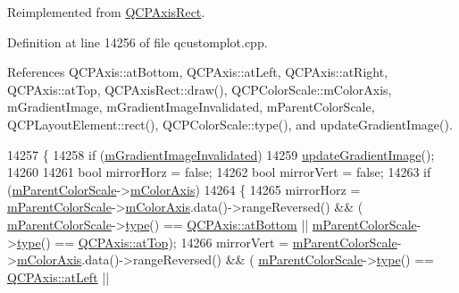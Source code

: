 Reimplemented from \hyperlink{class_q_c_p_axis_rect_afb1bbbbda8345cd2710d92ee48440b53}{Q\+C\+P\+Axis\+Rect}.



Definition at line 14256 of file qcustomplot.\+cpp.



References Q\+C\+P\+Axis\+::at\+Bottom, Q\+C\+P\+Axis\+::at\+Left, Q\+C\+P\+Axis\+::at\+Right, Q\+C\+P\+Axis\+::at\+Top, Q\+C\+P\+Axis\+Rect\+::draw(), Q\+C\+P\+Color\+Scale\+::m\+Color\+Axis, m\+Gradient\+Image, m\+Gradient\+Image\+Invalidated, m\+Parent\+Color\+Scale, Q\+C\+P\+Layout\+Element\+::rect(), Q\+C\+P\+Color\+Scale\+::type(), and update\+Gradient\+Image().


\begin{DoxyCode}
14257 \{
14258   \textcolor{keywordflow}{if} (\hyperlink{class_q_c_p_color_scale_axis_rect_private_a2c0b15b071e1f93006b48b5be022a631}{mGradientImageInvalidated})
14259     \hyperlink{class_q_c_p_color_scale_axis_rect_private_a73754cab312aeaddea1bfcc67cc079ac}{updateGradientImage}();
14260   
14261   \textcolor{keywordtype}{bool} mirrorHorz = \textcolor{keyword}{false};
14262   \textcolor{keywordtype}{bool} mirrorVert = \textcolor{keyword}{false};
14263   \textcolor{keywordflow}{if} (\hyperlink{class_q_c_p_color_scale_axis_rect_private_a311c73f51a4cb0b556388197833cf099}{mParentColorScale}->\hyperlink{class_q_c_p_color_scale_a2efbc90fd31898fe05d2b74a8422b1d5}{mColorAxis})
14264   \{
14265     mirrorHorz = \hyperlink{class_q_c_p_color_scale_axis_rect_private_a311c73f51a4cb0b556388197833cf099}{mParentColorScale}->\hyperlink{class_q_c_p_color_scale_a2efbc90fd31898fe05d2b74a8422b1d5}{mColorAxis}.data()->rangeReversed() && (
      \hyperlink{class_q_c_p_color_scale_axis_rect_private_a311c73f51a4cb0b556388197833cf099}{mParentColorScale}->\hyperlink{class_q_c_p_color_scale_a9a5236328c97fbfde01e3d91c4fcce6a}{type}() == \hyperlink{class_q_c_p_axis_ae2bcc1728b382f10f064612b368bc18aa220d68888516b6c3b493d144f1ba438f}{QCPAxis::atBottom} || 
      \hyperlink{class_q_c_p_color_scale_axis_rect_private_a311c73f51a4cb0b556388197833cf099}{mParentColorScale}->\hyperlink{class_q_c_p_color_scale_a9a5236328c97fbfde01e3d91c4fcce6a}{type}() == \hyperlink{class_q_c_p_axis_ae2bcc1728b382f10f064612b368bc18aac0ece2b680d3f545e701f75af1655977}{QCPAxis::atTop});
14266     mirrorVert = \hyperlink{class_q_c_p_color_scale_axis_rect_private_a311c73f51a4cb0b556388197833cf099}{mParentColorScale}->\hyperlink{class_q_c_p_color_scale_a2efbc90fd31898fe05d2b74a8422b1d5}{mColorAxis}.data()->rangeReversed() && (
      \hyperlink{class_q_c_p_color_scale_axis_rect_private_a311c73f51a4cb0b556388197833cf099}{mParentColorScale}->\hyperlink{class_q_c_p_color_scale_a9a5236328c97fbfde01e3d91c4fcce6a}{type}() == \hyperlink{class_q_c_p_axis_ae2bcc1728b382f10f064612b368bc18aaf84aa6cac6fb6099f54a2cbf7546b730}{QCPAxis::atLeft} || 

\end{DoxyCode}
